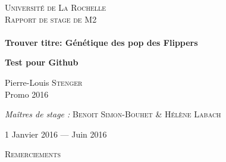 \documentclass[a4paper,12pt,twoside]{article}\usepackage[]{graphicx}\usepackage[]{color}
\begin{document}
\begin{titlepage}
  \begin{sffamily}
  \begin{center}



    \textsc{\LARGE Université de La Rochelle}\\[2cm]

    \textsc{\Large Rapport de stage de M2}\\[1.5cm]

    \HRule \\[0.4cm]
    { \huge \bfseries Trouver titre: Génétique des pop des Flippers\\[0.4cm] }
	
	   { \huge \bfseries Test pour Github\\[0.4cm] }

    \begin{minipage}{0.4\textwidth}
      \begin{flushleft} \large
        Pierre-Louis \textsc{Stenger}\\
        Promo 2016\\
      \end{flushleft}
    \end{minipage}
    \begin{minipage}{0.4\textwidth}
      \begin{flushright} \large
        \emph{Maîtres de stage :} \textsc{Benoit Simon-Bouhet} & \textsc{Hélène Labach}\\
      \end{flushright}
    \end{minipage}

    \vfill

    {\large 1\ier{} Janvier 2016 — Juin 2016}

  \end{center}
  \end{sffamily}
\end{titlepage}


 \setcounter{page}{1} 

\begin{center}
 \textsc{\LARGE Remerciements}\\[2cm]
\end{center}
\end{document}

